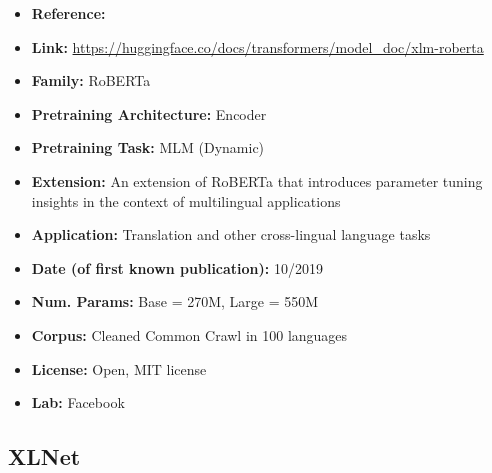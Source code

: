 \documentclass{article}
\begin{document}
            \begin{itemize}
                \item \textbf{Reference:} 
                \item \textbf{Link:} \url{https://huggingface.co/docs/transformers/model_doc/xlm-roberta}
                \item \textbf{Family:} RoBERTa
                \item \textbf{Pretraining Architecture:} Encoder
                \item \textbf{Pretraining Task:} MLM (Dynamic)
                \item \textbf{Extension:} An extension of RoBERTa that introduces parameter tuning insights in the context of multilingual applications
                \item \textbf{Application:} Translation and other cross-lingual language tasks
                \item \textbf{Date (of first known publication):} 10/2019
                \item \textbf{Num. Params:} Base = 270M, Large = 550M
                \item \textbf{Corpus:} Cleaned Common Crawl in 100 languages
                \item \textbf{License:} Open, MIT license
                \item \textbf{Lab:} Facebook
            \end{itemize}

\subsection{XLNet}
\end{document}
